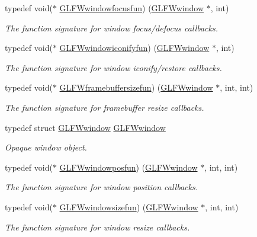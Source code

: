 \begin{DoxyCompactItemize}
typedef void($\ast$ \hyperlink{group__window_ga58be2061828dd35080bb438405d3a7e2}{G\+L\+F\+Wwindowfocusfun}) (\hyperlink{group__window_ga3c96d80d363e67d13a41b5d1821f3242}{G\+L\+F\+Wwindow} $\ast$, int)
\begin{DoxyCompactList}\small\item\em The function signature for window focus/defocus callbacks. \end{DoxyCompactList}\item 
typedef void($\ast$ \hyperlink{group__window_gad2d4e4c3d28b1242e742e8268b9528af}{G\+L\+F\+Wwindowiconifyfun}) (\hyperlink{group__window_ga3c96d80d363e67d13a41b5d1821f3242}{G\+L\+F\+Wwindow} $\ast$, int)
\begin{DoxyCompactList}\small\item\em The function signature for window iconify/restore callbacks. \end{DoxyCompactList}\item 
typedef void($\ast$ \hyperlink{group__window_ga3e218ef9ff826129c55a7d5f6971a285}{G\+L\+F\+Wframebuffersizefun}) (\hyperlink{group__window_ga3c96d80d363e67d13a41b5d1821f3242}{G\+L\+F\+Wwindow} $\ast$, int, int)
\begin{DoxyCompactList}\small\item\em The function signature for framebuffer resize callbacks. \end{DoxyCompactList}\item 
typedef struct \hyperlink{group__window_ga3c96d80d363e67d13a41b5d1821f3242}{G\+L\+F\+Wwindow} \hyperlink{group__window_ga3c96d80d363e67d13a41b5d1821f3242}{G\+L\+F\+Wwindow}
\begin{DoxyCompactList}\small\item\em Opaque window object. \end{DoxyCompactList}\item 
typedef void($\ast$ \hyperlink{group__window_gafd8db81fdb0e850549dc6bace5ed697a}{G\+L\+F\+Wwindowposfun}) (\hyperlink{group__window_ga3c96d80d363e67d13a41b5d1821f3242}{G\+L\+F\+Wwindow} $\ast$, int, int)
\begin{DoxyCompactList}\small\item\em The function signature for window position callbacks. \end{DoxyCompactList}\item 
typedef void($\ast$ \hyperlink{group__window_gae49ee6ebc03fa2da024b89943a331355}{G\+L\+F\+Wwindowsizefun}) (\hyperlink{group__window_ga3c96d80d363e67d13a41b5d1821f3242}{G\+L\+F\+Wwindow} $\ast$, int, int)
\begin{DoxyCompactList}\small\item\em The function signature for window resize callbacks. \end{DoxyCompactList}\item 

\end{DoxyCompactItemize}
